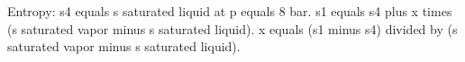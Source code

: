 Entropy:  
s4 equals s saturated liquid at p equals 8 bar.  
s1 equals s4 plus x times (s saturated vapor minus s saturated liquid).  
x equals (s1 minus s4) divided by (s saturated vapor minus s saturated liquid).